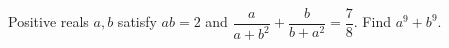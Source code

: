Positive reals $a,b$ satisfy $ab=2$ and $\dfrac{a}{a+b^2}+\dfrac{b}{b+a^2}=\dfrac{7}{8}$. Find $a^9+b^9$.
